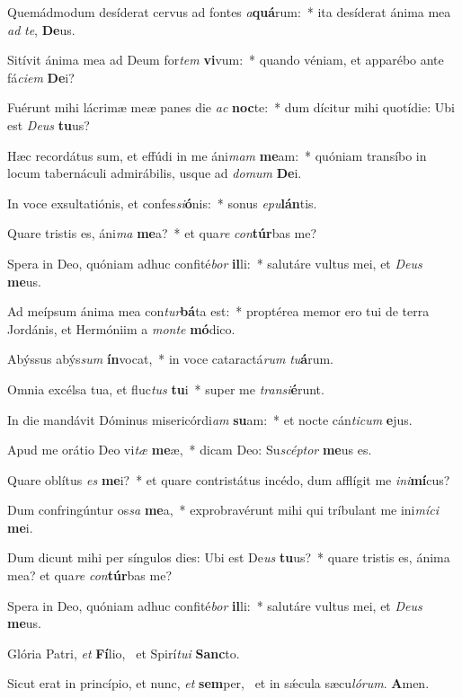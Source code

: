 \item Quemádmodum desíderat cervus ad fontes \textit{a}\textbf{quá}rum:~* ita desíderat ánima mea \textit{ad} \textit{te}, \textbf{De}us.
\item Sitívit ánima mea ad Deum for\textit{tem} \textbf{vi}vum:~* quando véniam, et apparébo ante fá\textit{ci}\textit{em} \textbf{De}i?
\item Fuérunt mihi lácrimæ meæ panes die \textit{ac} \textbf{noc}te:~* dum dícitur mihi quotídie: Ubi est \textit{De}\textit{us} \textbf{tu}us?
\item Hæc recordátus sum, et effúdi in me áni\textit{mam} \textbf{me}am:~* quóniam transíbo in locum tabernáculi admirábilis, usque ad \textit{do}\textit{mum} \textbf{De}i.
\item In voce exsultatiónis, et confes\textit{si}\textbf{ó}nis:~* sonus \textit{e}\textit{pu}\textbf{lán}tis.
\item Quare tristis es, áni\textit{ma} \textbf{me}a?~* et qua\textit{re} \textit{con}\textbf{túr}bas me?
\item Spera in Deo, quóniam adhuc confité\textit{bor} \textbf{il}li:~* salutáre vultus mei, et \textit{De}\textit{us} \textbf{me}us.
\item Ad meípsum ánima mea con\textit{tur}\textbf{bá}ta est:~* proptérea memor ero tui de terra Jordánis, et Hermóniim a \textit{mon}\textit{te} \textbf{mó}dico.
\item Abýssus abýs\textit{sum} \textbf{ín}vocat,~* in voce cataractá\textit{rum} \textit{tu}\textbf{á}rum.
\item Omnia excélsa tua, et fluc\textit{tus} \textbf{tu}i~* super me \textit{trans}\textit{i}\textbf{é}runt.
\item In die mandávit Dóminus misericórdi\textit{am} \textbf{su}am:~* et nocte cán\textit{ti}\textit{cum} \textbf{e}jus.
\item Apud me orátio Deo vi\textit{tæ} \textbf{me}æ,~* dicam Deo: Su\textit{scép}\textit{tor} \textbf{me}us es.
\item Quare oblítus \textit{es} \textbf{me}i?~* et quare contristátus incédo, dum afflígit me \textit{in}\textit{i}\textbf{mí}cus?
\item Dum confringúntur os\textit{sa} \textbf{me}a,~* exprobravérunt mihi qui tríbulant me ini\textit{mí}\textit{ci} \textbf{me}i.
\item Dum dicunt mihi per síngulos dies: Ubi est De\textit{us} \textbf{tu}us?~* quare tristis es, ánima mea? et qua\textit{re} \textit{con}\textbf{túr}bas me?
\item Spera in Deo, quóniam adhuc confité\textit{bor} \textbf{il}li:~* salutáre vultus mei, et \textit{De}\textit{us} \textbf{me}us.
\item Glória Patri, \textit{et} \textbf{Fí}lio,~\psstar{} et Spirí\textit{tu}\textit{i} \textbf{Sanc}to.
\item Sicut erat in princípio, et nunc, \textit{et} \textbf{sem}per,~\psstar{} et in sǽcula sæcu\textit{ló}\textit{rum}. \textbf{A}men.